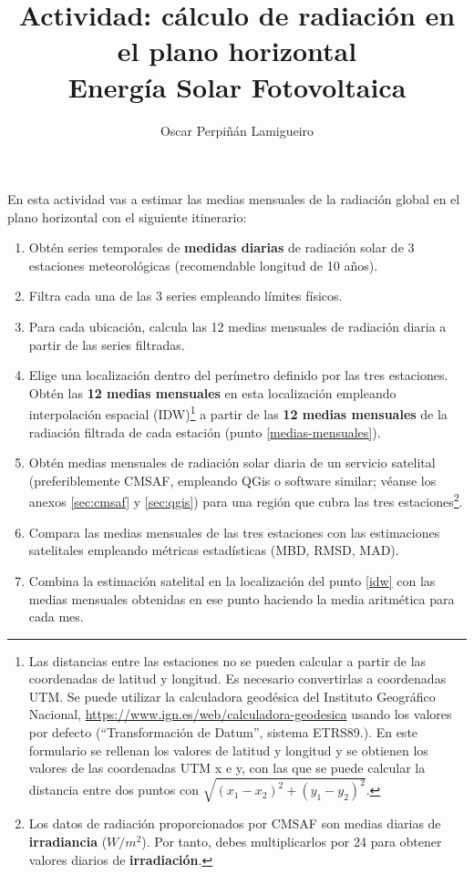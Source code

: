 \documentclass[11pt]{article}
\author{Oscar Perpiñán Lamigueiro}
\date{}
\title{Actividad: cálculo de radiación en el plano horizontal\\\medskip
\large Energía Solar Fotovoltaica}
\begin{document}
\maketitle

En esta actividad vas a estimar las medias mensuales de la radiación
global en el plano horizontal con el siguiente itinerario:

\begin{enumerate}
\item Obtén series temporales de \textbf{medidas diarias} de radiación
  solar de 3 estaciones meteorológicas (recomendable longitud de 10
  años).
\item Filtra cada una de las 3 series empleando límites físicos. \label{filtrado}
\item Para cada ubicación, calcula las 12 medias mensuales de
  radiación diaria a partir de las series filtradas. \label{medias-mensuales}
\item Elige una localización dentro del perímetro definido por las
  tres estaciones. Obtén las \textbf{12 medias mensuales} en esta
  localización empleando interpolación espacial (IDW)\footnote{Las
    distancias entre las estaciones no se pueden calcular a partir de
    las coordenadas de latitud y longitud. Es necesario convertirlas a
    coordenadas UTM. Se puede utilizar la calculadora geodésica del
    Instituto Geográfico Nacional,
    \url{https://www.ign.es/web/calculadora-geodesica} usando los
    valores por defecto (``Transformación de Datum'', sistema
    ETRS89.). En este formulario se rellenan los valores de latitud y
    longitud y se obtienen los valores de las coordenadas UTM x e y,
    con las que se puede calcular la distancia entre dos puntos con
    $\sqrt{(x_1 - x_2)^2 + (y_1 - y_2)^2}$.} a partir de las
  \textbf{12 medias mensuales} de la radiación filtrada de cada
  estación (punto \ref{medias-mensuales}). \label{idw}
\item Obtén medias mensuales de radiación solar diaria de un servicio
  satelital (preferiblemente CMSAF, empleando QGis o software similar;
  véanse los anexos \ref{sec:cmsaf} y \ref{sec:qgis}) para una región que
  cubra las tres estaciones\footnote{Los datos de radiación
    proporcionados por CMSAF son medias diarias de
    \textbf{irradiancia} (\(W/m^2\)). Por tanto, debes multiplicarlos
    por 24 para obtener valores diarios de
    \textbf{irradiación}.}.\label{satelite}
\item Compara las medias mensuales de las tres estaciones con las
  estimaciones satelitales empleando métricas estadísticas (MBD, RMSD,
  MAD).
\item Combina la estimación satelital en la localización del punto
  \ref{idw} con las medias mensuales obtenidas en ese punto haciendo
  la media aritmética para cada mes.
\end{enumerate}
\end{document}
